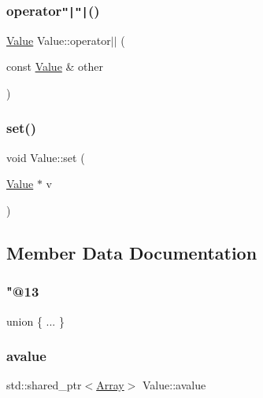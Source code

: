 \subsubsection{\texorpdfstring{operator\texttt{"|}\texttt{"|}()}{operator||()}}
{\footnotesize\ttfamily \hyperlink{classValue}{Value} Value\+::operator$\vert$$\vert$ (\begin{DoxyParamCaption}\item[{const \hyperlink{classValue}{Value} \&}]{other }\end{DoxyParamCaption})}

\mbox{\label{classValue_a83944ac4d53d5bd27fd6a0bd2bc1bd3a}} 
\subsubsection{\texorpdfstring{set()}{set()}}
{\footnotesize\ttfamily void Value\+::set (\begin{DoxyParamCaption}\item[{\hyperlink{classValue}{Value} $\ast$}]{v }\end{DoxyParamCaption})}



\subsection{Member Data Documentation}
\mbox{\label{classValue_ae48aa76df2e4a033b2594666d4eda707}} 
\subsubsection{\texorpdfstring{"@13}{@13}}
{\footnotesize\ttfamily union \{ ... \} }

\mbox{\label{classValue_acb0c09facf0b3b0a88f6fb5a240c1783}} 
\subsubsection{\texorpdfstring{avalue}{avalue}}
{\footnotesize\ttfamily std\+::shared\+\_\+ptr$<$\hyperlink{classArray}{Array}$>$ Value\+::avalue}

\mbox{\label{classValue_a6690838c4e198bd9b371108cffcd09e3}} 
